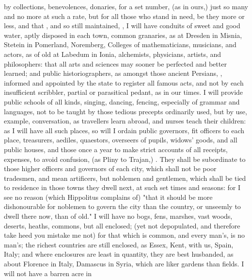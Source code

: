 by collections, benevolences, donaries, for a set number, (as in ours,) just so
many and no more at such a rate, but for all those who stand in need, be they
more or less, and that , and so still maintained,
, \etc{} I will have conduits of sweet and good
water, aptly disposed in each town, common granaries, as at
Dresden in Misnia, Stetein in Pomerland, Noremberg, \etc{} Colleges of
mathematicians, musicians, and actors, as of old at Labedum in Ionia,
alchemists, physicians, artists, and philosophers: that all
arts and sciences may sooner be perfected and better learned; and public
historiographers, as amongst those ancient Persians,
, informed
and appointed by the state to register all famous acts, and not by each
insufficient scribbler, partial or parasitical pedant, as in our times. I will
provide public schools of all kinds, singing, dancing, fencing, \etc{}
especially of grammar and languages, not to be taught by those tedious precepts
ordinarily used, but by use, example, conversation, as
travellers learn abroad, and nurses teach their children: as I will have all
such places, so will I ordain public governors, fit
officers to each place, treasurers, aediles, quaestors, overseers of pupils,
widows' goods, and all public houses, \etc{} and those once a year to make
strict accounts of all receipts, expenses, to avoid confusion,  (as Pliny to Trajan,) . They shall be
subordinate to those higher officers and governors of each city, which shall
not be poor tradesmen, and mean artificers, but noblemen and gentlemen, which
shall be tied to residence in those towns they dwell next, at such set times
and seasons: for I see no reason (which Hippolitus
complains of) "that it should be more dishonourable for noblemen to govern the
city than the country, or unseemly to dwell there now, than of old."
I will have no bogs, fens, marshes, vast woods, deserts,
heaths, commons, but all enclosed; (yet not depopulated, and therefore take
heed you mistake me not) for that which is common, and every man's, is no
man's; the richest countries are still enclosed, as Essex, Kent, with us,
\etc{} Spain, Italy; and where enclosures are least in quantity, they are best
husbanded, as about Florence in Italy, Damascus in Syria,
\etc{} which are liker gardens than fields. I will not have a barren acre in
